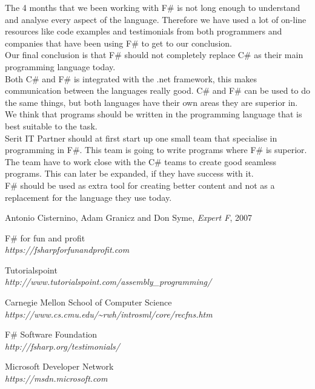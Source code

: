 \documentclass[12pt, a4paper]{article}
\begin{document}
The 4 months that we been working with F\# is not long enough to understand and analyse every aspect of the language. Therefore we have used a lot of on-line resources like code examples and testimonials from both programmers and companies that have been using F\# to get to our conclusion.\\

Our final conclusion is that F\# should not completely replace C\# as their main programming language today.\\  

Both C\# and F\# is integrated with the .net framework, this makes communication between the languages really good. C\# and F\# can be used to do the same things, but both languages have their own areas they are superior in. We think that programs should be written in the programming language that is best suitable to the task.\\

Serit IT Partner should at first start up one small team that specialise in programming in F\#. This team is going to write programs where F\# is superior. The team have to work close with the C\# teams to create good seamless programs. This can later be expanded, if they have success with it.\\

F\# should be used as extra tool for creating better content and not as a replacement for the language they use today. 

\newpage


\begin{thebibliography}{9}

Antonio Cisternino, Adam Granicz and Don Syme,
\textit{Expert F}, 
2007

F\# for fun and profit\\
\emph{https://fsharpforfunandprofit.com}

Tutorialspoint\\
\emph{http://www.tutorialspoint.com/assembly\_programming/}

Carnegie Mellon School of Computer Science\\
\emph{https://www.cs.cmu.edu/\textasciitilde rwh/introsml/core/recfns.htm}

F\# Software Foundation\\
\emph{http://fsharp.org/testimonials/}

Microsoft Developer Network\\
\emph{https://msdn.microsoft.com}


 
\end{thebibliography}
\newpage
\end{document}
